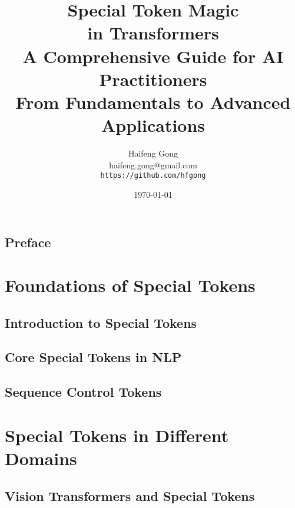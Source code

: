 \documentclass[11pt,oneside]{book}
\title{{\Huge \textbf{Special Token Magic\\in Transformers}}\\[0.5cm]
{\Large A Comprehensive Guide for AI Practitioners}\\[1cm]
{\large From Fundamentals to Advanced Applications}}
\author{{\Large Haifeng Gong}\\[0.3cm]
{\normalsize haifeng.gong@gmail.com}\\[0.5cm]
{\tt https://github.com/hfgong}}
\date{\today}
\theoremstyle{definition}
\theoremstyle{plain}
\theoremstyle{remark}
\begin{document}
\frontmatter
\maketitle

\tableofcontents

\chapter{Preface}


\mainmatter

\part{Foundations of Special Tokens}

\chapter{Introduction to Special Tokens}






\chapter{Core Special Tokens in NLP}





\chapter{Sequence Control Tokens}





\part{Special Tokens in Different Domains}

\chapter{Vision Transformers and Special Tokens}





\end{document}
